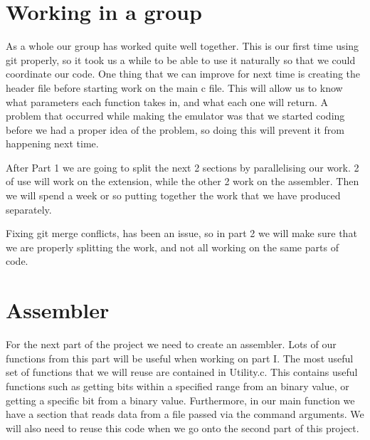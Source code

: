 \documentclass[a4paper]{article}
\begin{document}
\section{Working in a group}
As a whole our group has worked quite well together. This is our first time using git properly, so it took us a while to be able to use it naturally so that we could coordinate our code. One thing that we can improve for next time is creating the header file before starting work on the main c file. This will allow us to know what parameters each function takes in, and what each one will return. A problem that occurred while making the emulator was that we started coding before we had a proper idea of the problem, so doing this will prevent it from happening next time.

After Part 1 we are going to split the next 2 sections by parallelising our work. 2 of use will work on the extension, while the other 2 work on the assembler. Then we will spend a week or so putting together the work that we have produced separately.

Fixing git merge conflicts, has been an issue, so in part 2 we will make sure that we are properly splitting the work, and not all working on the same parts of code.

\section{Assembler}
For the next part of the project we need to create an assembler. Lots of our functions from this part will be useful when working on part I. The most useful set of functions that we will reuse are contained in Utility.c. This contains useful functions such as getting bits within a specified range from an binary value, or getting a specific bit from a binary value.
Furthermore, in our main function we have a section that reads data from a file passed via the command arguments. We will also need to reuse this code when we go onto the second part of this project.
\end{document}
